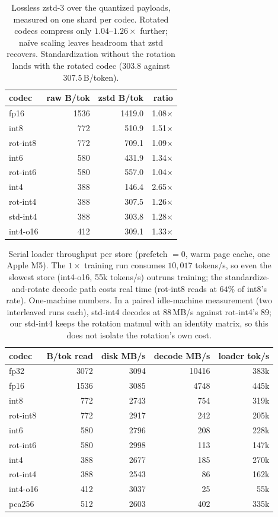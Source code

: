 \begin{table}[htbp]
\caption{Lossless zstd-3 over the quantized payloads, measured on one shard per codec. Rotated codecs compress only $1.04$--$1.26\times$ further; na\"ive scaling leaves headroom that zstd recovers. Standardization without the rotation lands with the rotated codec ($303.8$ against $307.5$\,B/token).}
\label{tab:entropy}
\centering\small
\begin{tabular}{lrrr}
\toprule
codec & raw B/tok & zstd B/tok & ratio \\
\midrule
fp16 & 1536 & 1419.0 & 1.08$\times$ \\
int8 & 772 & 510.9 & 1.51$\times$ \\
rot-int8 & 772 & 709.1 & 1.09$\times$ \\
int6 & 580 & 431.9 & 1.34$\times$ \\
rot-int6 & 580 & 557.0 & 1.04$\times$ \\
int4 & 388 & 146.4 & 2.65$\times$ \\
rot-int4 & 388 & 307.5 & 1.26$\times$ \\
std-int4 & 388 & 303.8 & 1.28$\times$ \\
int4-o16 & 412 & 309.1 & 1.33$\times$ \\
\bottomrule
\end{tabular}
\end{table}

\begin{table}[htbp]
\caption{Serial loader throughput per store (prefetch $= 0$, warm page cache, one Apple M5). The $1\times$ training run consumes $10{,}017$ tokens/s, so even the slowest store (int4-o16, 55k tokens/s) outruns training; the standardize-and-rotate decode path costs real time (rot-int8 reads at $64\%$ of int8's rate). One-machine numbers. In a paired idle-machine measurement (two interleaved runs each), std-int4 decodes at 88\,MB/s against rot-int4's 89; our std-int4 keeps the rotation matmul with an identity matrix, so this does not isolate the rotation's own cost.}
\label{tab:throughput}
\centering\small
\begin{tabular}{lrrrr}
\toprule
codec & B/tok read & disk MB/s & decode MB/s & loader tok/s \\
\midrule
fp32 & 3072 & 3094 & 10416 & 383k \\
fp16 & 1536 & 3085 & 4748 & 445k \\
int8 & 772 & 2743 & 754 & 319k \\
rot-int8 & 772 & 2917 & 242 & 205k \\
int6 & 580 & 2796 & 208 & 228k \\
rot-int6 & 580 & 2998 & 113 & 147k \\
int4 & 388 & 2677 & 185 & 270k \\
rot-int4 & 388 & 2543 & 86 & 162k \\
int4-o16 & 412 & 3037 & 25 & 55k \\
pca256 & 512 & 2603 & 402 & 335k \\
\bottomrule
\end{tabular}
\end{table}

